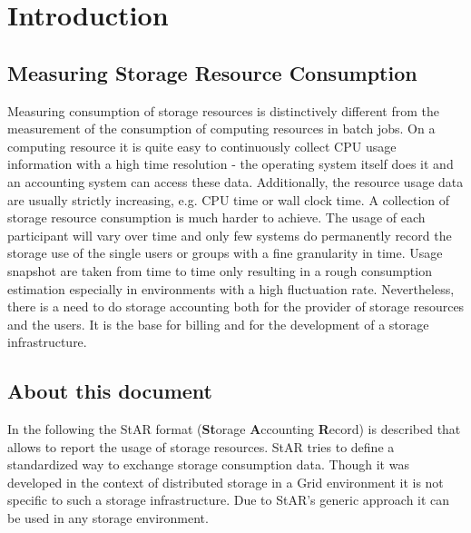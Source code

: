 \section{Introduction}

\subsection{Measuring Storage Resource Consumption}

Measuring consumption of storage resources is distinctively different from
the measurement of the consumption of computing resources in batch jobs. 
On a computing resource it is quite easy to continuously collect CPU 
usage information with a high time resolution - the operating system itself does 
it and an accounting system can access these data. Additionally,
the resource usage data are usually strictly increasing, e.g. 
CPU time or wall clock time.
A collection of storage resource consumption is much harder
to achieve. The usage of each participant will vary over time and only few 
systems do permanently record the storage use of the single users or 
groups with a fine granularity in time. 
Usage snapshot are taken from time to time only
resulting in a rough consumption estimation especially in environments
with a high fluctuation rate. 
Nevertheless, there is a need to do storage accounting both for the provider
of storage resources and the users. It is the base for billing and for 
the development of a storage infrastructure.



\subsection{About this document}
In the following the StAR format 
(\textbf{St}orage \textbf{A}ccounting \textbf{R}ecord) is described 
that allows to report the usage of 
storage resources. StAR tries to define a standardized way to exchange storage
consumption data. Though it was developed in the context of distributed storage
in a Grid environment it is not specific to such a storage infrastructure.
Due to StAR's generic approach it can be used in any storage environment.

